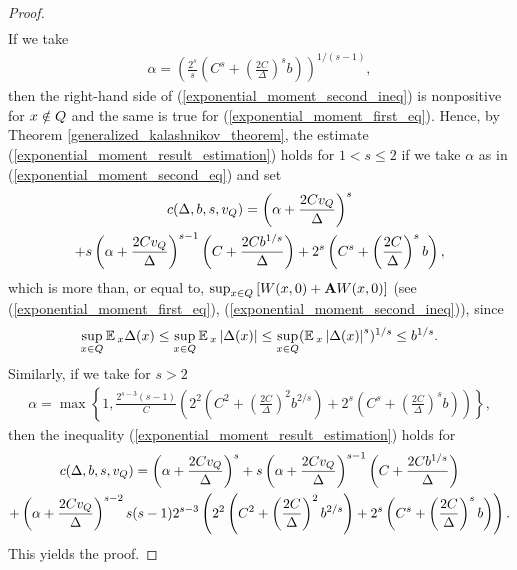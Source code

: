 \begin{proof}
\begin{gather}
		\label{exponential_moment_second_ineq}
		\end{gather}
		If we take
		\begin{gather}
		\alpha = \left(\frac{2^{s}}{s}\left(C^{s} + \left(\frac{2C}{\Delta}\right)^{s}b\right)\right)^{1 / (s-1)},
		\label{exponential_moment_second_eq}
		\end{gather}
		then the right-hand side of (\ref{exponential_moment_second_ineq}) is nonpositive for $x \notin Q$ and the same is true for (\ref{exponential_moment_first_eq}). Hence, by Theorem \ref{generalized_kalashnikov_theorem}, the estimate (\ref{exponential_moment_result_estimation}) holds for $1 < s \leq 2$ if we take $\alpha$ as in (\ref{exponential_moment_second_eq}) and set
		\begin{gather}
		c(\Delta, b, s, v_{Q}) = \left(\alpha + \frac{2Cv_{Q}}{\Delta}\right)^{s} \notag\\ + s\left(\alpha + \frac{2Cv_{Q}}{\Delta}\right)^{s-1}\left(C + \frac{2Cb^{1/s}}{\Delta}\right) + 2^{s}\left(C^{s} + \left(\frac{2C}{\Delta}\right)^{s}b\right),
		\label{exponential_moment_third_eq}
		\end{gather}
		which is more than, or equal to, $\sup_{x \in Q}\left[W(x, 0) + \mathbf{A}W(x, 0)\right]$ (see (\ref{exponential_moment_first_eq}), (\ref{exponential_moment_second_ineq})), since
		\begin{gather*}
		\sup_{x \in Q}\operatorname*{\mathbb{E}}{}_{x}\Delta(x) \leq \sup_{x \in Q}\operatorname*{\mathbb{E}}{}_{x}\left|\Delta(x)\right| \leq \sup_{x \in Q}(\operatorname*{\mathbb{E}}{}_{x}\left|\Delta(x)\right|^{s})^{1/s} \leq b^{1/s}.
		\end{gather*}
		Similarly, if we take for $s > 2$
		\begin{gather*}
		\alpha = \max\left\{1, \frac{2^{s-3}(s-1)}{C}\left(2^{2}\left(C^{2} + \left(\frac{2C}{\Delta}\right)^{2}b^{2/s}\right) + 2^{s}\left(C^{s} + \left(\frac{2C}{\Delta}\right)^{s}b\right)\right)\right\},
		\label{exponential_moment_alpha}
		\end{gather*}
		then the inequality (\ref{exponential_moment_result_estimation}) holds for
		\begin{gather}
		c(\Delta, b, s, v_{Q}) = \left(\alpha + \frac{2Cv_{Q}}{\Delta}\right)^{s} + s\left(\alpha + \frac{2Cv_{Q}}{\Delta}\right)^{s-1}\left(C + \frac{2Cb^{1/s}}{\Delta}\right) \notag\\ + \left(\alpha + \frac{2Cv_{Q}}{\Delta}\right)^{s-2}s(s-1)2^{s-3}\left(2^{2}\left(C^{2} + \left(\frac{2C}{\Delta}\right)^{2}b^{2/s}\right) + 2^{s}\left(C^{s} + \left(\frac{2C}{\Delta}\right)^{s}b\right)\right).
		\label{exponential_moment_c}
		\end{gather}
		This yields the proof.
	\end{proof}
	
